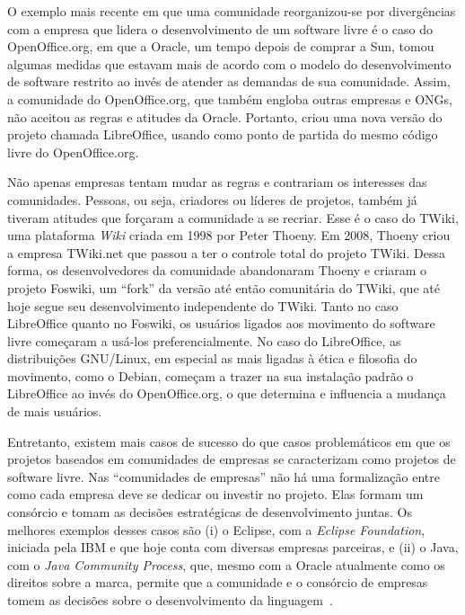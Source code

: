 O exemplo mais recente em que uma comunidade reorganizou-se por divergências
com a empresa que lidera o desenvolvimento de um software livre é o caso
do OpenOffice.org, em que a Oracle, um tempo depois de comprar a Sun,
tomou algumas medidas que estavam mais de acordo com o modelo do desenvolvimento
de software restrito ao invés de atender as demandas de sua comunidade.
%
Assim, a comunidade do OpenOffice.org, que também engloba outras empresas e ONGs,
não aceitou as regras e atitudes da Oracle. Portanto, criou uma nova versão do projeto
chamada LibreOffice, usando como ponto de partida do mesmo código livre do OpenOffice.org.


Não apenas empresas tentam mudar as regras e contrariam os interesses das
comunidades. Pessoas, ou seja, criadores ou líderes de projetos, também já
tiveram atitudes que forçaram a comunidade a se recriar.
%
Esse é o caso do TWiki, uma plataforma \textit{Wiki} criada em 1998 por
Peter Thoeny. Em 2008, Thoeny criou a empresa TWiki.net que passou a ter
o controle total do projeto TWiki. Dessa forma, os desenvolvedores da comunidade
abandonaram Thoeny e criaram o projeto Foswiki, um ``fork'' da versão até
então comunitária do TWiki, que até hoje segue seu desenvolvimento
independente do TWiki.
%
Tanto no caso LibreOffice quanto no Foswiki, os usuários ligados aos
movimento do software livre começaram a usá-los preferencialmente. No caso do
LibreOffice, as distribuições GNU/Linux, em especial as mais
ligadas à ética e filosofia do movimento, como o Debian, começam a trazer
na sua instalação padrão o LibreOffice ao invés do OpenOffice.org, o que determina
e influencia a mudança de mais usuários.


Entretanto, existem mais casos de sucesso do que casos problemáticos em que os projetos baseados em
comunidades de empresas se caracterizam como projetos de software livre.
%
Nas ``comunidades de empresas'' não há uma formalização entre como cada empresa
deve se dedicar ou investir no projeto. Elas formam um consórcio e tomam as
decisões estratégicas de desenvolvimento juntas.
%
Os melhores exemplos desses casos são (i) o Eclipse, com a \emph{Eclipse Foundation},
iniciada pela IBM e que hoje conta com diversas empresas parceiras, e (ii) o
Java, com o \emph{Java Community Process}, que, mesmo com a Oracle atualmente
como os direitos sobre a marca, permite que a comunidade e o consórcio
de empresas tomem as decisões sobre o desenvolvimento da linguagem~\cite{corbucci:2011}.
%


